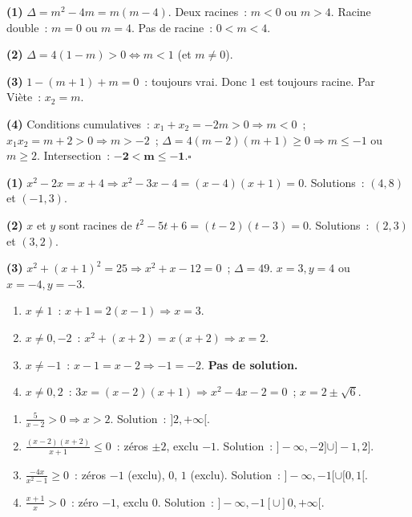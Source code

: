 
\textbf{(1)} $\Delta=m^2-4m=m(m-4)$.
Deux racines~: $m<0$ ou $m>4$.
Racine double~: $m=0$ ou $m=4$.
Pas de racine~: $0<m<4$.

\textbf{(2)} $\Delta=4(1-m)>0\Leftrightarrow m<1$ (et $m\ne0$).

\textbf{(3)} $1-(m+1)+m=0$~: toujours vrai. Donc $1$ est toujours racine.
Par Vi\`ete~: $x_2=m$.

\textbf{(4)} Conditions cumulatives~:
$x_1+x_2=-2m>0\Rightarrow m<0$~;
$x_1x_2=m+2>0\Rightarrow m>-2$~;
$\Delta=4(m-2)(m+1)\geq0\Rightarrow m\leq-1$ ou $m\geq2$.
Intersection~: $\mathbf{-2<m\leq-1}$.\hfill$\square$


\textbf{(1)} $x^2-2x=x+4\Rightarrow x^2-3x-4=(x-4)(x+1)=0$.
Solutions~: $(4,8)$ et $(-1,3)$.

\textbf{(2)} $x$ et $y$ sont racines de $t^2-5t+6=(t-2)(t-3)=0$.
Solutions~: $(2,3)$ et $(3,2)$.

\textbf{(3)} $x^2+(x+1)^2=25\Rightarrow x^2+x-12=0$~; $\Delta=49$.
$x=3,y=4$ ou $x=-4,y=-3$.


\begin{enumerate}
  \item $x\ne1$~: $x+1=2(x-1)\Rightarrow x=3$.
  \item $x\ne0,-2$~: $x^2+(x+2)=x(x+2)\Rightarrow x=2$.
  \item $x\ne-1$~: $x-1=x-2\Rightarrow-1=-2$. \textbf{Pas de solution.}
  \item $x\ne0,2$~: $3x=(x-2)(x+1)\Rightarrow x^2-4x-2=0$~; $x=2\pm\sqrt{6}$.
\end{enumerate}


\begin{enumerate}
  \item $\frac{5}{x-2}>0\Rightarrow x>2$. Solution~: $]2,+\infty[$.
  \item $\frac{(x-2)(x+2)}{x+1}\leq0$~: z\'eros $\pm2$, exclu $-1$.
        Solution~: $]-\infty,-2]\cup]-1,2]$.
  \item $\frac{-4x}{x^2-1}\geq0$~: z\'eros $-1$ (exclu), $0$, $1$ (exclu).
        Solution~: $]-\infty,-1[\cup[0,1[$.
  \item $\frac{x+1}{x}>0$~: z\'ero $-1$, exclu $0$.
        Solution~: $]-\infty,-1[\cup]0,+\infty[$.
\end{enumerate}

